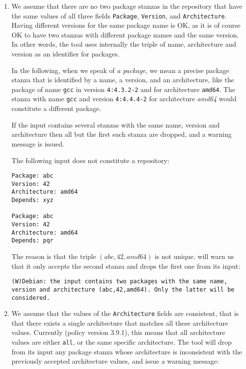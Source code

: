 \begin{enumerate}
\item
  We assume that there are no two package stanzas in the repository
  that have the same values of all three fields \texttt{Package},
  \texttt{Version}, and \texttt{Architecture}. Having different
  versions for the same package name is OK, as it is of course OK to
  have two stanzas with different package names and the same version.
  In other words, the \debcheck{} tool uses internally the triple of
  name, architecture and version as an identifier for packages.

  In the following, when we speak of \emph{a package}, we mean a
  precise package stanza that is identified by a name, a version, and
  an architecture, like the package of name \texttt{gcc} in version
  \texttt{4:4.3.2-2} and for architecture \texttt{amd64}. The stanza with name
  \texttt{gcc} and version \texttt{4:4.4.4-2} for architecture
  \textit{amd64} would constitute a different package.

  If the input contains several stanzas with the same name, version
  and architecture then all but the first such stanza are dropped, and a 
  warning message is issued.

\begin{example} The following input does not constitute a repository:
\begin{verbatim}
Package: abc
Version: 42
Architecture: amd64
Depends: xyz

Package: abc
Version: 42
Architecture: amd64
Depends: pqr
\end{verbatim}
The reason is that the triple $(abc,42,amd64)$ is not
unique. \debcheck{} will warn us that it only accepts the second
stanza and drops the first one from its input:
\begin{verbatim}
(W)Debian: the input contains two packages with the same name, version and architecture (abc,42,amd64). Only the latter will be considered.
\end{verbatim}
\end{example}

\item
  We assume that the values of the \texttt{Architecture} fields are
  consistent, that is that there exists a single architecture that
  matches all these architecture values. Currently (policy version
  3.9.1), this means that all architecture values are either
  \texttt{all}, or the same specific architecture. The \debcheck{} tool
  will drop from its input any package stanza whose architecture is
  inconsistent with the previously accepted architecture values, and
  issue a warning message:


\end{enumerate}
